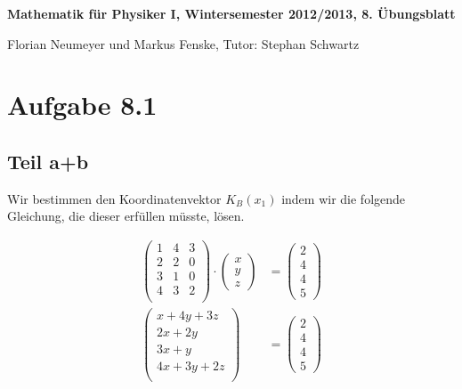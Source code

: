 \documentclass[a4paper,german,12pt,smallheadings]{scrartcl}
\begin{document}
\begin{center}
\bfseries %
\sffamily %
\vspace{-40pt}
Mathematik für Physiker I, Wintersemester 2012/2013, 8. Übungsblatt

Florian Neumeyer und Markus Fenske, Tutor: Stephan Schwartz
\vspace{-10pt}
\end{center}


\section*{Aufgabe 8.1}
\subsection*{Teil a+b}

Wir bestimmen den Koordinatenvektor $K_B(x_1)$ indem wir die folgende Gleichung, die dieser erfüllen müsste, lösen.

\begin{align*}
  \begin{pmatrix}
     1 & 4 & 3 \\
     2 & 2 & 0 \\
     3 & 1 & 0 \\
     4 & 3 & 2 \\
  \end{pmatrix}
  \cdot
  \begin{pmatrix}
    x \\
    y \\
    z
  \end{pmatrix}
  &=
  \begin{pmatrix}
    2 \\
    4 \\
    4 \\
    5
  \end{pmatrix} \\
  \begin{pmatrix}
     x + 4y + 3z \\
     2x + 2y \\
     3x + y \\
     4x + 3y + 2z \\
  \end{pmatrix}
  &=
  \begin{pmatrix}
    2 \\
    4 \\
    4 \\
    5
  \end{pmatrix}
\end{align*}
\end{document}
